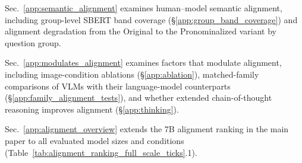 \documentclass[letterpaper]{article} %
\begin{document}
Sec.~\ref{app:semantic_alignment} examines human--model semantic alignment, including group-level SBERT band coverage (\S\ref{app:group_band_coverage}) and alignment degradation from the Original to the Pronominalized variant by question group.

Sec.~\ref{app:modulates_alignment} examines factors that modulate alignment, including image-condition ablations (\S\ref{app:ablation}), matched-family comparisons of VLMs with their language-model counterparts (\S\ref{app:family_alignment_tests}), and whether extended chain-of-thought reasoning improves alignment (\S\ref{app:thinking}).

Sec.~\ref{app:alignment_overview} extends the 7B alignment ranking in the main paper to all evaluated model sizes and conditions (Table~\ref{tab:alignment_ranking_full_scale_ticks}.1).





\end{document}

